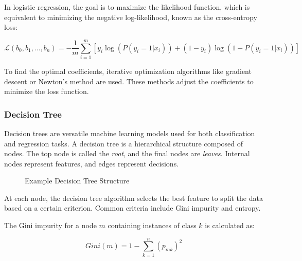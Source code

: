 In logistic regression, the goal is to maximize the likelihood function, which is equivalent to minimizing the negative log-likelihood, known as the cross-entropy loss:

\begin{equation}
    \mathcal{L}(b_0, b_1, \ldots, b_n) = -\frac{1}{m}\sum_{i=1}^{m} \left[y_i\log\left(P(y_i=1|x_i)\right) + (1-y_i)\log\left(1-P(y_i=1|x_i)\right)\right]
\end{equation}


To find the optimal coefficients, iterative optimization algorithms like gradient descent or Newton's method are used. These methods adjust the coefficients to minimize the loss function.

\subsubsection{Decision Tree}

Decision trees are versatile machine learning models used for both classification and regression tasks. A decision tree is a hierarchical structure composed of nodes. The top node is called the \textit{root}, and the final nodes are \textit{leaves}. Internal nodes represent features, and edges represent decisions.

\begin{figure}[h]
    \centering
    \caption{Example Decision Tree Structure}
\end{figure}


At each node, the decision tree algorithm selects the best feature to split the data based on a certain criterion. Common criteria include Gini impurity and entropy.

The Gini impurity for a node \(m\) containing instances of class \(k\) is calculated as:

\begin{equation}
    Gini(m) = 1 - \sum_{k=1}^{n} (p_{mk})^2
\end{equation}


